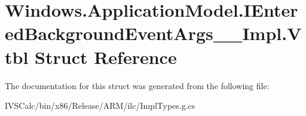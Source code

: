 \hypertarget{struct_windows_1_1_application_model_1_1_i_entered_background_event_args_____impl_1_1_vtbl}{}\section{Windows.\+Application\+Model.\+I\+Entered\+Background\+Event\+Args\+\_\+\+\_\+\+Impl.\+Vtbl Struct Reference}
\label{struct_windows_1_1_application_model_1_1_i_entered_background_event_args_____impl_1_1_vtbl}


The documentation for this struct was generated from the following file\+:\begin{DoxyCompactItemize}
\item 
I\+V\+S\+Calc/bin/x86/\+Release/\+A\+R\+M/ilc/Impl\+Types.\+g.\+cs\end{DoxyCompactItemize}
